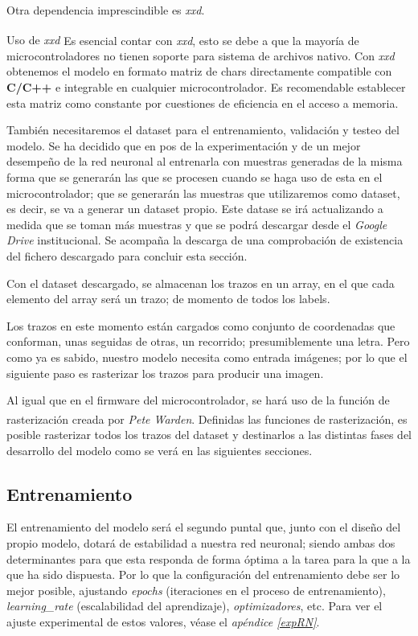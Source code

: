 Otra dependencia imprescindible es \textit{xxd}.
\begin{teoria}{Uso de \textit{xxd}\textsuperscript{\cite{tf-xxd}}}
    \color{mitexto}
    Es esencial contar con \textit{xxd}, esto se debe a que la mayoría de
    microcontroladores no tienen soporte para sistema de archivos nativo.
    Con \textit{xxd} obtenemos el modelo en formato matriz de chars directamente
    compatible con \textbf{C/C++} e integrable en cualquier microcontrolador.\newline
    Es recomendable establecer esta matriz como constante por cuestiones de
    eficiencia en el acceso a memoria.
\end{teoria}
\newpage

También necesitaremos el dataset para el entrenamiento, validación y testeo
del modelo. Se ha decidido que en pos de la experimentación y de un mejor desempeño
de la red neuronal al entrenarla con muestras generadas de la misma forma que se generarán
las que se procesen cuando se haga uso de esta en el microcontrolador; que se generarán
las muestras que utilizaremos como dataset, es decir, se va a generar un dataset propio.
Este datase se irá
actualizando a medida que se toman más muestras y que se podrá descargar
desde el \textit{Google Drive} institucional. Se acompaña la descarga de una comprobación
de existencia del fichero descargado para concluir esta sección.

Con el dataset descargado, se almacenan los trazos en un array, en el que
cada elemento del array será un trazo; de momento de todos los labels.

Los trazos en este momento están cargados como conjunto de coordenadas que
conforman, unas seguidas de otras, un recorrido; presumiblemente una letra.
Pero como ya es sabido, nuestro modelo necesita como entrada imágenes; por lo que
el siguiente paso es rasterizar los trazos para producir una imagen.

Al igual que en el firmware del microcontrolador, se hará uso de la función de rasterización creada
por \textit{Pete Warden}\textsuperscript{\cite{petewardenmw}}. Definidas las funciones de
rasterización, es posible rasterizar todos los trazos del dataset y destinarlos a las distintas
fases del desarrollo del modelo como se verá en las siguientes secciones.

\subsection{Entrenamiento}
El entrenamiento del modelo será el segundo puntal que, junto con el diseño del
propio modelo, dotará de estabilidad a nuestra red neuronal; siendo ambas dos
determinantes para que esta responda de forma óptima a la tarea para la que a
la que ha sido dispuesta.
Por lo que la configuración del entrenamiento debe ser lo mejor posible, ajustando
\textit{epochs} (iteraciones en el proceso de entrenamiento), \textit{learning\_rate}
(escalabilidad del aprendizaje), \textit{optimizadores}, etc.
Para ver el ajuste experimental de estos valores, véase el \textit{apéndice \ref{expRN}}.

